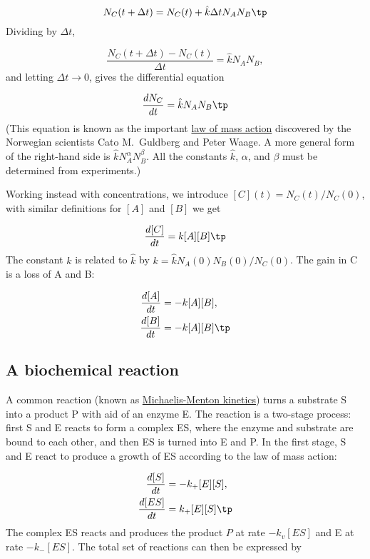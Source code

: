 \documentclass[graybox,sectrefs,envcountresetchap,open=right,final]{svmonodo}
\begin{document}
\[ N_C(t+\Delta t) = N_C(t) + \hat k\Delta t N_AN_B\tp\]
Dividing by $\Delta t$,

\[ \frac{N_C(t+\Delta t) - N_C(t)}{\Delta t} = \hat k N_AN_B,\]
and letting $\Delta t\rightarrow 0$, gives the differential equation

\[ \frac{dN_C}{dt} = \hat k N_AN_B\tp\]
(This equation is known as the important \href{{https://en.wikipedia.org/wiki/Law_of_mass_action}}{law of mass action} discovered by
the Norwegian scientists Cato M.~Guldberg and Peter Waage.
A more general form of the right-hand side is $\hat kN_A^{\alpha}N_B^{\beta}$.
All the constants $\hat k$, $\alpha$, and $\beta$ must be determined from
experiments.)

Working instead with concentrations, we introduce $[C](t)=N_C(t)/N_C(0)$,
with similar definitions for $[A]$ and $[B]$ we get

\begin{equation}
\frac{d[C]}{dt} = k [A][B]\tp
\end{equation}
The constant $k$ is related to $\hat k$ by $k = \hat k N_A(0)N_B(0)/N_C(0)$.
The gain in C is a loss of A and B:

\begin{align}
\frac{d[A]}{dt} &= -k[A][B],\\ 
\frac{d[B]}{dt} &= -k[A][B]\tp
\end{align}

\subsection{A biochemical reaction}

A common reaction (known as \href{{https://en.wikipedia.org/wiki/Michaelis-Menten_kinetics}}{Michaelis-Menton kinetics}) turns a substrate S into
a product P with aid of an enzyme E. The reaction is a two-stage process:
first S and E reacts to form a complex ES, where the enzyme and substrate
are bound to each other, and then ES is turned into E and P.
In the first stage, S and E react to produce a growth of ES according
to the law of mass action:

\begin{align*}
\frac{d[S]}{dt} &= - k_+[E][S],\\ 
\frac{d[ES]}{dt} &= k_+[E][S]\tp\\ 
\end{align*}
The complex ES reacts and produces the product $P$ at rate
$-k_{v}[ES]$ and E at rate $-k_-[ES]$. The total set of reactions can
then be expressed by
\end{document}
